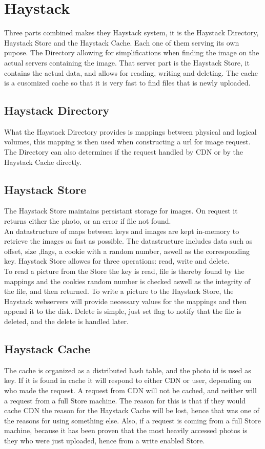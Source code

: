 \section{Haystack}
  Three parts combined makes they Haystack system, it is the 
  Haystack Directory, Haystack Store and the Haystack Cache.
  Each one of them serving its own pupose. The Directory allowing for
  simplifications when finding the image on the actual servers containing the
  image. That server part is the Haystack Store, it contains the actual data, and
  allows for reading, writing and deleting. The cache is a cusomized cache so that
  it is very fast to find files that is newly uploaded.
  
\subsection{Haystack Directory}
  What the Haystack Directory provides is mappings between physical and logical
  volumes, this mapping is then used when constructing a url for image request.
  The Directory can also determines if the request handled by CDN or by the 
  Haystack Cache directly. 
\subsection{Haystack Store}
  The Haystack Store maintains persistant storage for images. On request it returns
  either the photo, or an error if file not found. \\
  An datastructure of maps between keys and images are kept in-memory to retrieve
  the images as fast as possible. The datastructure includes data such as offset,
  size ,flags, a cookie with a random number,  aswell as the corresponding key.  
  Haystack Store allowes for three operations: read, write and delete.\\
  To read a picture from the Store the key is read, file is thereby found by the mappings
  and the cookies random number is checked aswell as the integrity of the file, and then
  returned. To write a picture to the Haystack Store, the Haystack webservers will provide
  necessary values for the mappings and then append it to the disk.
  Delete is simple, just set flag to notify that the file is deleted, and the delete
  is handled later.
  
\subsection{Haystack Cache}
  The cache is organized as a distributed hash table, and the photo id is used as key.
  If it is found in cache it will respond to either CDN or user, depending on who made
  the request. A request from CDN will not be cached, and neither will a request from a
  full Store machine. The reason for this is that if they would cache CDN the reason for
  the Haystack Cache will be lost, hence that was one of the reasons for using something
  else. Also, if a request is coming from a full Store machine, because it has been proven
  that the most heavily accessed photos is they who were just uploaded, hence from a write 
  enabled Store.
 

